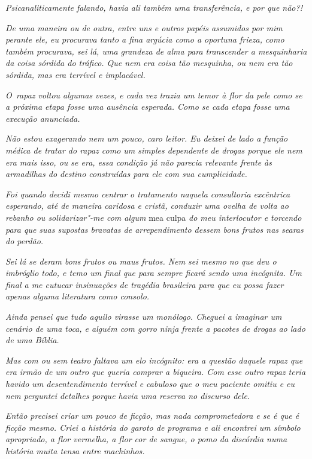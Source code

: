\emph{Psicanaliticamente falando, havia ali também uma transferência, e
por que não?!}

\emph{De uma maneira ou de outra, entre uns e outros papéis assumidos
por mim perante ele, eu procurava tanto a fina argúcia como a oportuna
frieza, como também procurava, sei lá, uma grandeza de alma para
transcender a mesquinharia da coisa sórdida do tráfico. Que nem era
coisa tão mesquinha, ou nem era tão sórdida, mas era terrível e
implacável.}

\emph{O~rapaz voltou algumas vezes, e cada vez trazia um temor à flor da
pele como se a próxima etapa fosse uma ausência esperada. Como se cada
etapa fosse uma execução anunciada.}

\emph{Não estou exagerando nem um pouco, caro leitor. Eu deixei de lado
a função médica de tratar do rapaz como um simples dependente de drogas
porque ele nem era mais isso, ou se era, essa condição já não parecia
relevante frente às armadilhas do destino construídas para ele com sua
cumplicidade.}

\emph{Foi quando decidi mesmo centrar o tratamento naquela consultoria
excêntrica esperando, até de maneira caridosa e cristã, conduzir uma
ovelha de volta ao rebanho ou solidarizar"-me com algum} mea culpa \emph{do meu
interlocutor e torcendo para que suas supostas bravatas de
arrependimento dessem bons frutos nas searas do perdão.}

\emph{Sei lá se deram bons frutos ou maus frutos. Nem sei mesmo no que
deu o imbróglio todo, e temo um final que para sempre ficará sendo uma
incógnita. Um final a me cutucar insinuações de tragédia brasileira para
que eu possa fazer apenas alguma literatura como consolo.}

\emph{Ainda pensei que tudo aquilo virasse um monólogo. Cheguei a
imaginar um cenário de uma toca, e alguém com gorro ninja frente a
pacotes de drogas ao lado de uma Bíblia.}

\emph{Mas com ou sem teatro faltava um elo incógnito: era a questão
daquele rapaz que era irmão de um outro que queria comprar a biqueira.
Com esse outro rapaz teria havido um desentendimento terrível e cabuloso
que o meu paciente omitiu e eu nem perguntei detalhes porque havia uma
reserva no discurso dele.}

\emph{Então precisei criar um pouco de ficção, mas nada comprometedora e
se é que é ficção mesmo. Criei a história do garoto de programa e ali
encontrei um símbolo apropriado, a flor vermelha, a flor cor de sangue,
o pomo da discórdia numa história muita tensa entre machinhos.}

